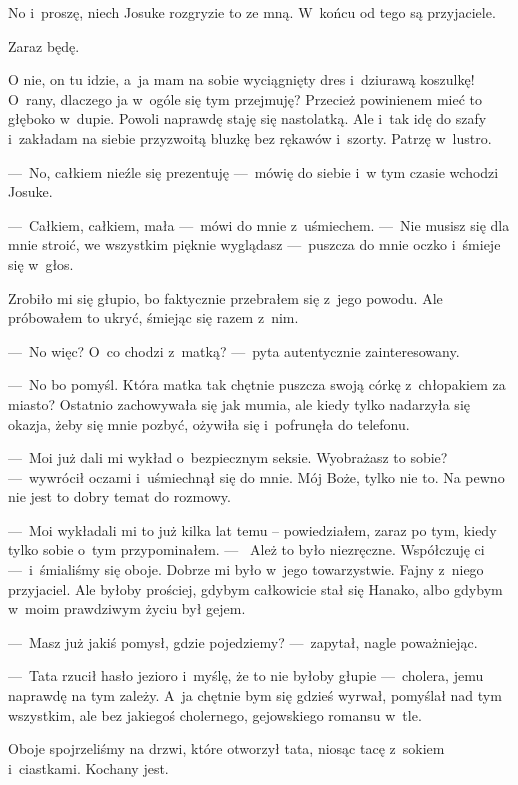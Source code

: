 No i~proszę, niech Josuke rozgryzie to ze mną. W~końcu od tego są przyjaciele.

\begin{sms}
Zaraz będę.
\end{sms}

O nie, on tu idzie, a~ja mam na sobie wyciągnięty dres i~dziurawą koszulkę! O~rany, dlaczego ja w~ogóle się tym 
przejmuję? Przecież powinienem mieć to głęboko w~dupie. Powoli naprawdę staję się  nastolatką. Ale i~tak idę do szafy 
i~zakładam na siebie przyzwoitą bluzkę bez rękawów i~szorty. Patrzę w~lustro.

---~No, całkiem nieźle się prezentuję ---~mówię do siebie i~w tym czasie wchodzi Josuke.

---~Całkiem, całkiem, mała ---~mówi do mnie z~uśmiechem. ---~Nie musisz się dla mnie stroić, we wszystkim pięknie 
wyglądasz ---~puszcza do mnie oczko i~śmieje się w~głos. 

Zrobiło mi się głupio, bo faktycznie przebrałem się z~jego powodu. Ale próbowałem to ukryć, śmiejąc się razem z~nim.

---~No więc? O~co chodzi z~matką? ---~pyta autentycznie zainteresowany.

---~No bo pomyśl. Która matka tak chętnie puszcza swoją córkę z~chłopakiem za miasto? Ostatnio zachowywała się jak 
mumia, ale kiedy tylko nadarzyła się okazja, żeby się mnie pozbyć, ożywiła się i~pofrunęła do telefonu.

---~Moi już dali mi wykład o~bezpiecznym seksie. Wyobrażasz to sobie? ---~wywrócił oczami i~uśmiechnął się do mnie. 
Mój Boże, tylko nie to. Na pewno nie jest to dobry temat do rozmowy.

---~Moi wykładali mi to już kilka lat temu -- powiedziałem, zaraz po tym, kiedy tylko sobie o~tym przypominałem. ---~
Ależ to było niezręczne. Współczuję ci ---~i~śmialiśmy się oboje. Dobrze mi było w~jego towarzystwie. Fajny z~niego 
przyjaciel. Ale byłoby prościej, gdybym całkowicie stał się Hanako, albo gdybym w~moim prawdziwym życiu był gejem.

---~Masz już jakiś pomysł, gdzie pojedziemy? ---~zapytał, nagle poważniejąc.

---~Tata rzucił hasło jezioro i~myślę, że to nie byłoby głupie ---~cholera, jemu naprawdę na tym zależy.  A~ja 
chętnie bym się gdzieś wyrwał, pomyślał nad tym wszystkim, ale bez jakiegoś cholernego, gejowskiego romansu w~tle. 

Oboje spojrzeliśmy na drzwi, które otworzył tata, niosąc tacę z~sokiem i~ciastkami. Kochany jest. 


